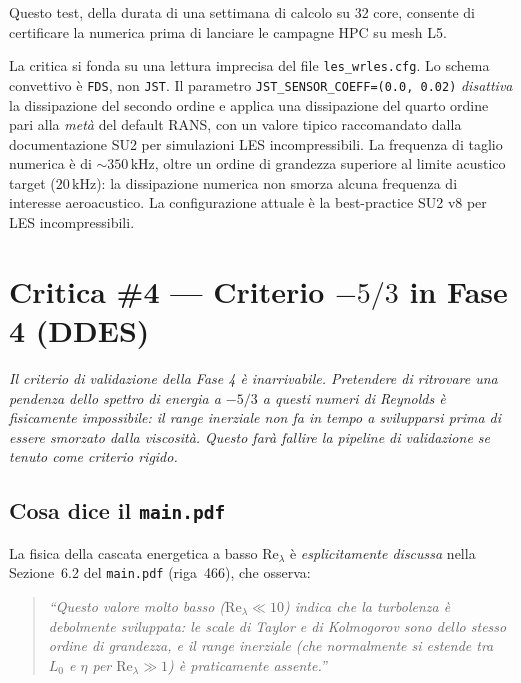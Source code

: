 \documentclass[11pt,a4paper]{article}
\newcommand{\Rey}{\mathrm{Re}}
\begin{document}
Questo test, della durata di una settimana di calcolo su 32 core,
consente di certificare la numerica prima di lanciare le
campagne HPC su mesh L5.

\begin{verdettofalsa}
La critica si fonda su una lettura imprecisa del file
\texttt{les\_wrles.cfg}. Lo schema convettivo è \texttt{FDS}, non
\texttt{JST}. Il parametro \texttt{JST\_SENSOR\_COEFF=(0.0, 0.02)}
\emph{disattiva} la dissipazione del secondo ordine e applica una
dissipazione del quarto ordine pari alla \emph{metà} del default
RANS, con un valore tipico raccomandato dalla documentazione SU2 per
simulazioni LES incompressibili. La frequenza di taglio numerica è
di $\sim 350\,\mathrm{kHz}$, oltre un ordine di grandezza superiore
al limite acustico target ($20\,\mathrm{kHz}$): la dissipazione
numerica non smorza alcuna frequenza di interesse aeroacustico. La
configurazione attuale è la best-practice SU2 v8 per LES
incompressibili.
\end{verdettofalsa}

\section{Critica \#4 — Criterio $-5/3$ in Fase 4 (DDES)}
\label{sec:c4}

\begin{citazione}
\textit{Il criterio di validazione della Fase 4 è inarrivabile.
Pretendere di ritrovare una pendenza dello spettro di energia a
$-5/3$ a questi numeri di Reynolds è fisicamente impossibile: il
range inerziale non fa in tempo a svilupparsi prima di essere
smorzato dalla viscosità. Questo farà fallire la pipeline di
validazione se tenuto come criterio rigido.}
\end{citazione}

\subsection{Cosa dice il \texttt{main.pdf}}

La fisica della cascata energetica a basso $\Rey_{\lambda}$ è
\emph{esplicitamente discussa} nella Sezione~6.2 del
\texttt{main.pdf} (riga~466), che osserva:

\begin{quote}\small\itshape
``Questo valore molto basso ($\Rey_{\lambda}\ll 10$) indica che la
turbolenza è \emph{debolmente sviluppata}: le scale di Taylor e di
Kolmogorov sono dello stesso ordine di grandezza, e il range
inerziale (che normalmente si estende tra $L_{0}$ e $\eta$ per
$\Rey_{\lambda}\gg 1$) è praticamente assente.''
\end{quote}
\end{document}
